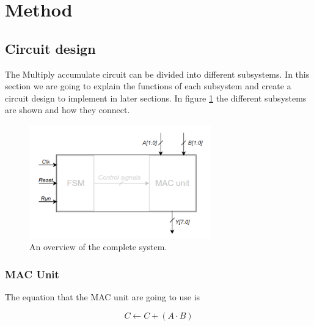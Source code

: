 \section{Method}
\label{sec:method}

\subsection{Circuit design}
\label{subsec:circuitDesign}
The Multiply accumulate circuit can be divided into different subsystems. In this section we are going to explain the functions of each subsystem and create a circuit design to implement in later sections. In figure \ref{fig:blokk} the different subsystems are shown and how they connect. 

\begin{figure}[H]
    \centering
    \includegraphics[width=0.7\textwidth]{Figures/Blokk.png}
    \caption{An overview of the complete system.}
    \label{fig:blokk}
\end{figure}

\subsubsection{MAC Unit}
The equation that the MAC unit are going to use is

\begin{equation}
    C \leftarrow C + (A \cdot B)
\end{equation}

